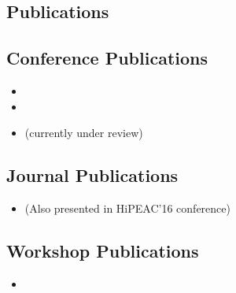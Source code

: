 \begin{appendices}
\chapter{Publications}
\section{Conference Publications}
\begin{itemize}
	\item {}
	\item {}
	\item {} (currently under review)
\end{itemize}

\section{Journal Publications}
\begin{itemize}
				\item {} (Also presented in HiPEAC'16 conference)
\end{itemize}

\section{Workshop Publications}
\begin{itemize}
	\item {}
\end{itemize}

\end{appendices}
